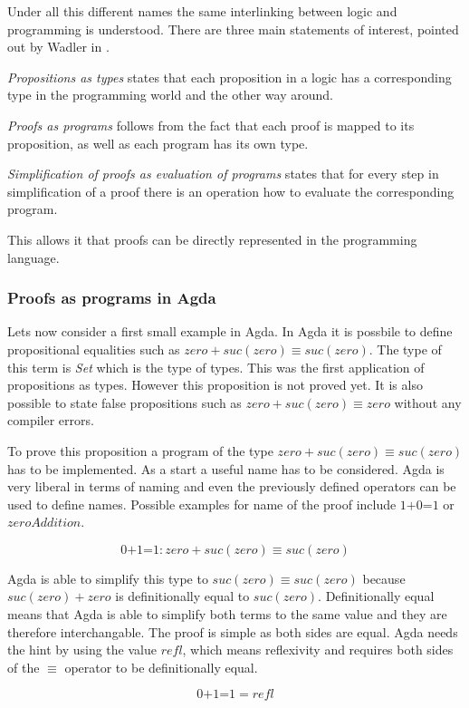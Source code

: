 Under all this different names the same interlinking between logic and programming is understood. There are three main statements of interest, pointed out by Wadler in \cite{10.1145/2699407}.

\emph{Propositions as types} states that each proposition in a logic has a corresponding type in the programming world and the other way around. 

\emph{Proofs as programs} follows from the fact that each proof is mapped to its proposition, as well as each program has its own type.

\emph{Simplification of proofs as evaluation of programs} states that for every step in simplification of a proof there is an operation how to evaluate the corresponding program.

This allows it that proofs can be directly represented in the programming language.

\subsubsection{Proofs as programs in Agda}
Lets now consider a first small example in Agda.
In Agda it is possbile to define propositional equalities such as $zero + suc(zero) \equiv suc(zero)$. The type of this term is \emph{Set} which is the type of types. This was the first application of propositions as types.
However this proposition is not proved yet. It is also possible to state false propositions such as $zero + suc(zero) \equiv zero$ without any compiler errors.

To prove this proposition a program of the type $zero + suc(zero) \equiv suc(zero)$ has to be implemented.
As a start a useful name has to be considered. Agda is very liberal in terms of naming and even the previously defined operators can be used to define names. Possible examples for name of the proof include $\text{1+0=1}$ or $zeroAddition$.

$$\text{0+1=1} : zero + suc(zero) \equiv suc(zero)$$

Agda is able to simplify this type to $suc(zero) \equiv suc(zero)$ because $suc(zero) + zero$ is definitionally equal to $suc(zero)$. Definitionally equal means that Agda is able to simplify both terms to the same value and they are therefore interchangable.
The proof is simple as both sides are equal. 
Agda needs the hint by using the value $refl$, which means reflexivity and requires both sides of the $\equiv$ operator to be definitionally equal.

$$\text{0+1=1} = refl$$

